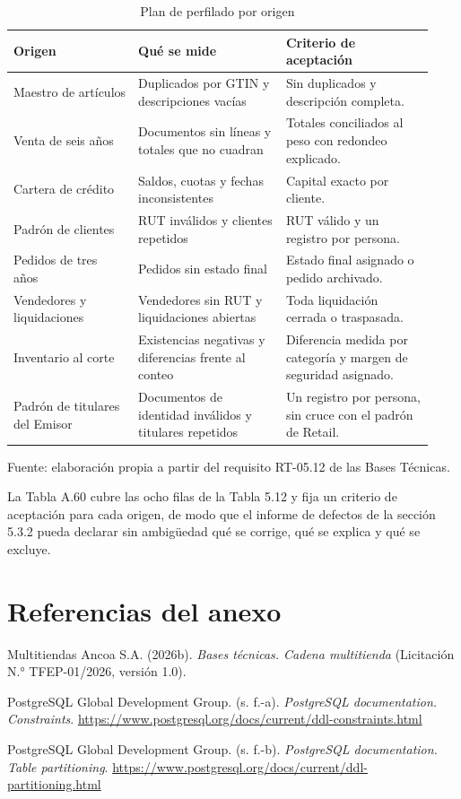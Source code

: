 \documentclass[11pt]{article}
\begin{document}
\begin{table}[htbp]
\caption{Plan de perfilado por origen}\label{tab:perfilado}
\centering
\begin{tabular}{@{}p{0.275\linewidth}p{0.326\linewidth}p{0.326\linewidth}@{}}
\toprule Origen & Qué se mide & Criterio de aceptación \\
\midrule
Maestro de artículos & Duplicados por GTIN y descripciones vacías & Sin duplicados y descripción completa. \\
Venta de seis años & Documentos sin líneas y totales que no cuadran & Totales conciliados al peso con redondeo explicado. \\
Cartera de crédito & Saldos, cuotas y fechas inconsistentes & Capital exacto por cliente. \\
Padrón de clientes & RUT inválidos y clientes repetidos & RUT válido y un registro por persona. \\
Pedidos de tres años & Pedidos sin estado final & Estado final asignado o pedido archivado. \\
Vendedores y liquidaciones & Vendedores sin RUT y liquidaciones abiertas & Toda liquidación cerrada o traspasada. \\
Inventario al corte & Existencias negativas y diferencias frente al conteo & Diferencia medida por categoría y margen de seguridad asignado. \\
Padrón de titulares del Emisor & Documentos de identidad inválidos y titulares repetidos & Un registro por persona, sin cruce con el padrón de Retail. \\
\bottomrule
\end{tabular}
\par\smallskip
{\raggedright Fuente: elaboración propia a partir del requisito RT-05.12 de las Bases Técnicas.\par}
\end{table}


La Tabla A.60 cubre las ocho filas de la Tabla 5.12 y fija un criterio de aceptación para cada origen, de modo que el informe de defectos de la sección 5.3.2 pueda declarar sin ambigüedad qué se corrige, qué se explica y qué se excluye.

\section*{Referencias del anexo}

Multitiendas Ancoa S.A. (2026b). \textit{Bases técnicas. Cadena multitienda} (Licitación N.° TFEP-01/2026, versión 1.0).

PostgreSQL Global Development Group. (s. f.-a). \textit{PostgreSQL documentation. Constraints}. \url{https://www.postgresql.org/docs/current/ddl-constraints.html}

PostgreSQL Global Development Group. (s. f.-b). \textit{PostgreSQL documentation. Table partitioning}. \url{https://www.postgresql.org/docs/current/ddl-partitioning.html}

\ossFinalPage
\end{document}
